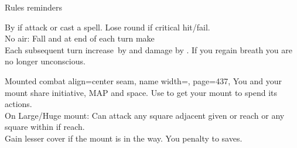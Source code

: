 \begin{PageFrontLandscape}
\begin{TablesHalf}{\frontTableHeight}
\begin{Table}{Rules reminders}
\begin{entry}{}
{                By  if attack or cast a spell.
                Lose  round if critical hit/fail.}\\
                No air: Fall  and at end of each turn make \Fortitude[][val=20]  \hfill
                \\
                Each subsequent turn increase \DC\,by  and damage by . \hfill
                If you regain breath you are no longer unconscious.%
            \end{entry}
            \begin{entry}{Mounted combat}{%
                align=center seam,
                name width=\conditionLength,
                page=437,
            }
                You and your mount share initiative, MAP and space.
                Use  to get your mount to spend its actions.\\
                On Large/Huge mount: Can attack any square adjacent given  or  \Feet reach or any square within  \Feet if  \Feet reach.\\
                Gain lesser cover if the mount is in the way. You  \Cirm penalty to \ReflexT saves.\hfill
            \end{entry}

        \end{Table}
    \end{TablesHalf}%
\end{PageFrontLandscape}